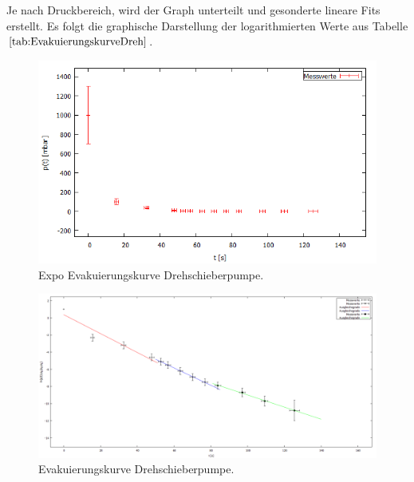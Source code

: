 Je nach Druckbereich, wird der Graph unterteilt und gesonderte lineare Fits erstellt.
Es folgt die graphische Darstellung der logarithmierten Werte aus Tabelle $\ref{tab:EvakuierungskurveDreh}$.

\begin{figure}[H]
  \centering
  \includegraphics[width=14cm]{bilder/drehexpo.png}
  \caption{Expo Evakuierungskurve Drehschieberpumpe.}
  \label{expoevakuierungdreh}
\end{figure}
\begin{figure}[H]
  \centering
  \includegraphics[width=14cm]{bilder/evakuierung Dreh.png}
  \caption{Evakuierungskurve Drehschieberpumpe.}
  \label{evakuierungdreh}
\end{figure}

